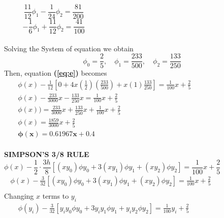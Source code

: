 \documentclass[a4paper,12pt]{report}
\newcommand{\bt}[1]{\textbf{#1}}
\newcommand{\sps}{\\[0.2cm]}
\newcommand{\refn}[1]{\textbf{(\ref{#1})}}
\newcommand{\NI}{\noindent}
\begin{document}
	\begin{equation}
		\frac{11}{12}\phi_1 - \frac{1}{24}\phi_2 = \frac{81}{200}\quad\quad\quad\quad\quad\quad\quad\quad\quad\quad\quad\quad\quad\quad\quad\quad\quad\quad\quad\quad\quad\quad \tag{ii}
	\end{equation}
	\begin{equation}
		-\frac{1}{6}\phi_1 + \frac{11}{12}\phi_2 = \frac{41}{100}\quad\quad\quad\quad\quad\quad\quad\quad\quad\quad\quad\quad\quad\quad\quad\quad\quad\quad\quad\quad\quad\quad \tag{iii}
	\end{equation}
	\\[-0.3cm]Solving the System of equation we obtain
	$$
		\phi_0 = \frac{2}{5}, \quad \phi_1 = \frac{233}{500}, \quad \phi_2 = \frac{133}{250}
	$$
	Then, equation \refn{eq:e} becomes
	\begin{eqnarray*}
		\phi(x) - \frac{1}{12}\left[ 0 + 4x\left(\frac{1}{2}\right)\left(\frac{233}{500}\right) + x\left(1\right)\frac{133}{250} \right] = \frac{1}{100}x + \frac{2}{5}\quad\quad\quad\quad\quad\quad\sps
		\phi(x) - \frac{233}{3000}x - \frac{133}{250}x = \frac{1}{100}x + \frac{2}{5}\quad\quad\quad\quad\quad\quad\quad\quad\quad\quad\quad\quad\quad\quad\quad\quad\sps
		\phi(x)) = \frac{233}{3000}x + \frac{133}{250}x + \frac{1}{100}x + \frac{2}{5}\quad\quad\quad\quad\quad\quad\quad\quad\quad\quad\quad\quad\quad\quad\quad\;\;\sps
		\phi(x) = \frac{1859}{3000}x + \frac{2}{5}\quad\quad\quad\quad\quad\quad\quad\quad\quad\quad\quad\quad\quad\quad\quad\quad\quad\quad\quad\quad\quad\quad\quad\sps
		\mathbf{\phi(x) = 0.61967x + 0.4}\quad\quad\quad\quad\quad\quad\quad\quad\quad\quad\quad\quad\quad\quad\quad\quad\quad\quad\quad\quad\quad\;
	\end{eqnarray*}
	\\
	\NI\bt{SIMPSON'S 3/8 RULE}
	\begin{equation}
		\phi(x) - \frac{1}{2} \cdot \frac{3h}{8} \left[(xy_0)\phi y_0 + 3(xy_1)\phi y_1 + (xy_2)\phi y_2\right] = \frac{1}{100}x + \frac{2}{5}\quad\quad\quad\quad\quad\quad \tag{3} \label{eq:f}
	\end{equation}
	\begin{eqnarray*}
		\phi(x) - \frac{3}{32}\left[(xy_0)\phi y_0 + 3(xy_1)\phi y_1 + (xy_2)\phi y_2 \right] = \frac{1}{100}x + \frac{2}{5}\quad\quad\quad\quad\quad\quad\sps
	\end{eqnarray*}
	Changing $x$ terms to $y_i$
	\begin{eqnarray*}
		\phi(y_i) - \frac{3}{32}\left[y_iy_0\phi y_0 + 3y_iy_1\phi y_1 + y_iy_2\phi y_2 \right] = \frac{1}{100}y_i + \frac{2}{5}\quad\quad\quad\quad\quad\quad\quad\quad
	\end{eqnarray*}
\end{document}

